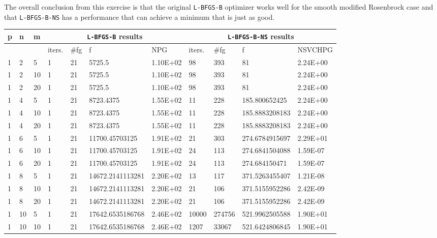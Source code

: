 The overall conclusion from this exercise is that the original \texttt{L-BFGS-B} optimizer works well for the smooth modified Rosenbrock case and that \texttt{L-BFGS-B-NS} has a performance that can achieve a minimum that is just as good.


\begin{table}
  \scriptsize
  \begin{center}
    \begin{tabular}{|l|l|l|l|l|l|l|l|l|l|l|}
      \hline
      p  &  n  &  m  & \multicolumn{4}{|c|}{\texttt{L-BFGS-B} results} & \multicolumn{4}{|c|}{\texttt{L-BFGS-B-NS} results} \\ \hline
      & &  & iters. & \#fg & f & NPG & iters. & \#fg & f & NSVCHPG \\ \hline
      1 & 2 & 5  & 1 & 21 & 5725.5 & 1.10E+02 & 98 & 393 & 81 & 2.24E+00 \\
      1 &   2 & 10  & 1 & 21 & 5725.5 & 1.10E+02 & 98 & 393 & 81 & 2.24E+00\\
      1 &   2 & 20 & 1 & 21 & 5725.5 & 1.10E+02 & 98 & 393 & 81 & 2.24E+00 \\
      1 &   4 & 5 & 1 & 21 & 8723.4375 & 1.55E+02 & 11 & 228 & 185.800652425 & 2.24E+00\\
      1 &   4 & 10 & 1 & 21 & 8723.4375 & 1.55E+02 & 11 & 228 & 185.8883208183 & 2.24E+00 \\
      1 &  4 & 20 & 1 & 21 & 8723.4375 & 1.55E+02 & 11 & 228 & 185.8883208183 & 2.24E+00\\
      1 &   6 & 5 & 1 & 21 & 11700.45703125 & 1.91E+02 & 21 & 303 & 274.6784915697 & 2.29E+01\\ 
      1 &  6 & 10  & 1 & 21 & 11700.45703125 & 1.91E+02 & 24 & 113 & 274.6841504088 & 1.59E-07\\
      1 &   6 & 20  & 1 & 21 & 11700.45703125 & 1.91E+02 & 24 & 113 & 274.684150471 & 1.59E-07\\
      1 &   8 & 5 &  1 & 21 & 14672.2141113281 & 2.20E+02 & 13 & 117 & 371.5263455407 & 1.21E-08\\
      1 &   8 & 10  & 1 & 21 & 14672.2141113281 & 2.20E+02 & 21 & 106 & 371.5155952286 & 2.42E-09\\
      1 &  8 & 20  & 1 & 21 & 14672.2141113281 & 2.20E+02 & 21 & 106 & 371.5155952286 & 2.42E-09\\
      1 &   10 & 5  & 1 & 21 & 17642.6535186768 & 2.46E+02 & 10000 & 274756 & 521.9962505588 & 1.90E+01 \\
      1 &   10 & 10  & 1 & 21 & 17642.6535186768 & 2.46E+02 & 1207 & 33067 & 521.6424806845 & 1.90E+01\\

\end{tabular}
\end{center}
\end{table}
